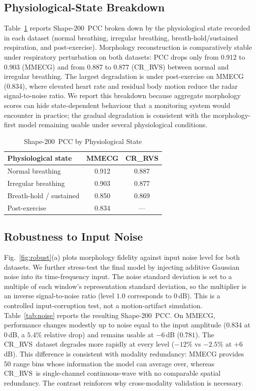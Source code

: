 \documentclass[lettersize,journal]{IEEEtran}
\newcommand{\shape}{Shape-200\xspace}
\newcommand{\crrvs}{CR\_RVS\xspace}
\begin{document}
\subsection{Physiological-State Breakdown}
Table~\ref{tab:states} reports \shape\ PCC broken down by the physiological state
recorded in each dataset (normal breathing, irregular breathing, breath-hold/sustained
respiration, and post-exercise). Morphology reconstruction is comparatively stable under respiratory
perturbation on both datasets: PCC drops only from 0.912 to 0.903 (MMECG) and from 0.887
to 0.877 (\crrvs) between normal and irregular breathing. The largest degradation is under
post-exercise on MMECG (0.834), where elevated heart rate and residual body motion reduce
the radar signal-to-noise ratio. We report this breakdown because aggregate morphology
scores can hide state-dependent behaviour that a monitoring system would encounter in
practice; the gradual degradation is consistent with the morphology-first model remaining usable under several physiological conditions.

\begin{table}[!t]
\centering
\caption{\shape\ PCC by Physiological State}
\label{tab:states}
\begin{tabular}{lcc}
\toprule
Physiological state & MMECG & \crrvs \\
\midrule
Normal breathing & 0.912 & 0.887 \\
Irregular breathing & 0.903 & 0.877 \\
Breath-hold / sustained & 0.850 & 0.869 \\
Post-exercise & 0.834 & --- \\
\bottomrule
\end{tabular}
\end{table}

\subsection{Robustness to Input Noise}
Fig.~\ref{fig:robust}(a) plots morphology fidelity against input noise level for both datasets.
We further stress-test the final model by injecting additive Gaussian noise into its time-frequency input. The noise standard deviation is set to a multiple of each window's representation standard deviation, so the multiplier is an inverse signal-to-noise ratio (level $1.0$ corresponds to $0$\,dB). This is a controlled input-corruption test, not a motion-artifact simulation. Table~\ref{tab:noise} reports the resulting \shape\ PCC. On MMECG, performance changes modestly up to noise equal to the input amplitude ($0.834$ at $0$\,dB, a $5.4\%$ relative drop) and remains usable at $-6$\,dB ($0.781$). The \crrvs\ dataset degrades more rapidly at every level ($-12\%$ vs $-2.5\%$ at $+6$\,dB). This difference is consistent with modality redundancy: MMECG provides 50 range bins whose information the model can average over, whereas \crrvs\ is single-channel continuous-wave with no comparable spatial redundancy. The contrast reinforces why cross-modality validation is necessary.
\end{document}

